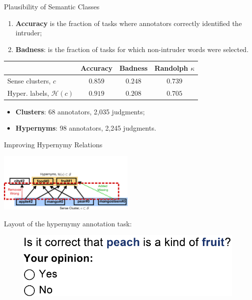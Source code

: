 \documentclass[usenames,dvipsnames]{beamer}
\begin{document}
\begin{frame}{Plausibility of Semantic Classes}


\begin{enumerate}
	\item \textbf{Accuracy} is the fraction of tasks where annotators correctly identified the intruder; 
	\item \textbf{Badness}: is the fraction of tasks for which non-intruder words were selected.  
\end{enumerate}

\pause

\begin{tabular}{l|c|c|c}
\textbf{} & \textbf{Accuracy} & \textbf{Badness} & \textbf{Randolph $\kappa$} \\ \toprule
Sense clusters, $c$ & $0.859$ & $0.248$ & $0.739$ \\
Hyper. labels, $\mathcal{H}(c)$  & $0.919$ & $0.208$ & $0.705$ \\
\end{tabular}

\pause 

\begin{itemize}
	\item \textbf{Clusters}: 68 annotators, 2,035 judgments; 
	\item \textbf{Hypernyms}: 98 annotators, 2,245 judgments.
\end{itemize}

\end{frame}



\begin{frame}{ Improving Hypernymy Relations }

\vspace{-20pt}

\begin{center}
\includegraphics[width=0.5\textwidth]{figures/e2}
\end{center}

\pause

Layout of the hypernymy annotation task:

\begin{figure}
  \centering
  \includegraphics[width=.75\textwidth]{figures/exp3-hit}
\end{figure}

\end{frame}
\end{document}
